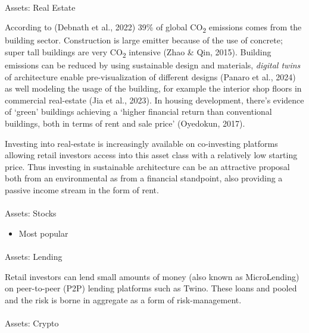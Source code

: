 \documentclass[
  letterpaper,
  DIV=11,
  numbers=noendperiod]{scrartcl}
\makeatletter
\let\oldparagraph\paragraph
\renewcommand{\paragraph}{
    \@ifstar
      \xxxParagraphStar
      \xxxParagraphNoStar
  }
\newcommand{\xxxParagraphStar}[1]{\oldparagraph*{#1}\mbox{}}
\newcommand{\xxxParagraphNoStar}[1]{\oldparagraph{#1}\mbox{}}
\providecommand{\tightlist}{%
  \setlength{\itemsep}{0pt}\setlength{\parskip}{0pt}}\usepackage{longtable,booktabs,array}
\makeatother
\begin{document}
\paragraph{Assets: Real Estate}\label{assets-real-estate}

According to (Debnath et al., 2022) 39\% of global CO\textsubscript{2}
emissions comes from the building sector. Construction is large emitter
because of the use of concrete; super tall buildings are very
CO\textsubscript{2} intensive (Zhao \& Qin, 2015). Building emissions
can be reduced by using sustainable design and materials, \emph{digital
twins} of architecture enable pre-visualization of different designs
(Panaro et al., 2024) as well modeling the usage of the building, for
example the interior shop floors in commercial real-estate (Jia et al.,
2023). In housing development, there's evidence of `green' buildings
achieving a `higher financial return than conventional buildings, both
in terms of rent and sale price' (Oyedokun, 2017).

Investing into real-estate is increasingly available on co-investing
platforms allowing retail investors access into this asset class with a
relatively low starting price. Thus investing in sustainable
architecture can be an attractive proposal both from an environmental as
from a financial standpoint, also providing a passive income stream in
the form of rent.

\paragraph{Assets: Stocks}\label{assets-stocks}

\begin{itemize}
\tightlist
\item
  Most popular
\end{itemize}

\paragraph{Assets: Lending}\label{assets-lending}

Retail investors can lend small amounts of money (also known as
MicroLending) on peer-to-peer (P2P) lending platforms such as Twino.
These loans and pooled and the risk is borne in aggregate as a form of
risk-management.

\paragraph{Assets: Crypto}\label{assets-crypto}
\end{document}
